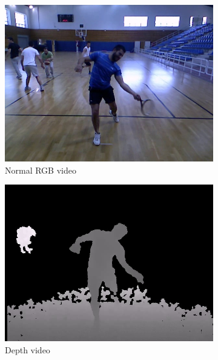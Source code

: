 \begin{figure}
    \centering
    \begin{subfigure}{.49\linewidth}
        \includegraphics[width=\linewidth]{Pics/04_Data/frame53.jpg}
        \caption{Normal RGB video}
    \end{subfigure}
    \begin{subfigure}{.49\linewidth}
        \includegraphics[width=\linewidth]{Pics/04_Data/frame53_depth.jpg}
        \caption{Depth video}
    \end{subfigure}
    \begin{subfigure}{.32\linewidth}

\end{subfigure}
\end{figure}
